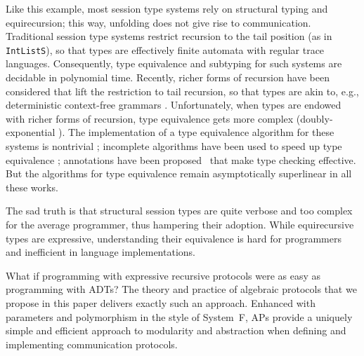 Like this example, most session type systems 
rely on structural typing and equirecursion; 
this way, unfolding does not give rise to communication.
Traditional session type systems restrict 
recursion to the tail position (as in \lstinline/IntListS/), so that types are effectively finite
automata with regular trace languages. Consequently, type equivalence
and subtyping for such systems are decidable in polynomial time.  Recently, richer forms of recursion
have been considered that lift the restriction to tail recursion, so
that types are akin to, e.g.,  deterministic context-free grammars
\cite{DBLP:conf/icfp/ThiemannV16,DBLP:conf/esop/Padovani17,DBLP:journals/toplas/Padovani19,DBLP:journals/corr/abs-2106-06658,
  DBLP:conf/esop/DasDMP21}.  
Unfortunately, when types are endowed with richer forms 
of recursion, type equivalence gets more complex 
(doubly-exponential \cite{DBLP:conf/esop/DasDMP21}). 
The implementation of a type equivalence algorithm for these systems is nontrivial
\cite{DBLP:conf/tacas/AlmeidaMV20}; incomplete algorithms have been
used to speed up type equivalence \cite{DBLP:conf/esop/DasDMP21};
annotations have been proposed~\cite{DBLP:journals/toplas/Padovani19}
that make type checking effective. But the algorithms for
type equivalence remain asymptotically superlinear in all these works.

The sad truth is that structural session types are quite verbose and
too complex for the average programmer, thus hampering their adoption. While equirecursive types are
expressive, understanding their equivalence is hard for programmers
and inefficient in language implementations.

What if programming with expressive recursive protocols were as easy as
programming with ADTs? The theory and practice of algebraic protocols
that we propose in this paper delivers exactly such an
approach. Enhanced with parameters and polymorphism in the style of
System~F, APs provide a uniquely simple and efficient approach to modularity and abstraction
when defining and implementing communication protocols.


